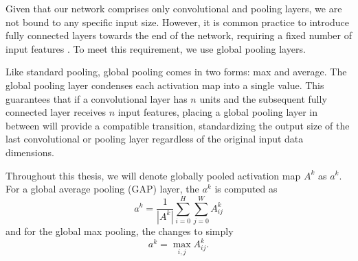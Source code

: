 Given that our network comprises only convolutional and pooling layers, we are not bound to any specific input size.
However, it is common practice to introduce fully connected layers towards the end of the network, requiring a fixed number of input features \cite{cnns}.
To meet this requirement, we use global pooling layers.

Like standard pooling, global pooling comes in two forms: max and average.
The global pooling layer condenses each activation map into a single value.
This guarantees that if a convolutional layer has $n$ units and the subsequent fully connected layer receives $n$ input features, placing a global pooling layer in between will provide a compatible transition, standardizing the output size of the last convolutional or pooling layer regardless of the original input data dimensions.

Throughout this thesis, we will denote globally pooled activation map $A^k$ as $a^k$. For a global average pooling (GAP) layer, the $a^k$ is computed as
\begin{equation}\label{gap}
    a^k = \frac{1}{|A^k|} \sum_{i=0}^H \sum_{j=0}^W A^k_{ij}
\end{equation}
and for the global max pooling, the  changes to simply
\begin{equation}
    a^k = \max_{i,j} A^k_{ij}.
\end{equation}